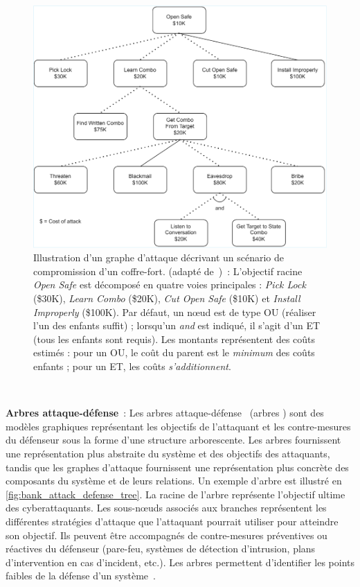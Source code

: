 \begin{figure}[h!]
  \centering
  \includegraphics[width=0.8\linewidth]{figures/attack_graph.pdf}
  \caption[Illustration d'un graphe d'attaque décrivant un scénario de compromission d'un coffre-fort.]{Illustration d'un graphe d'attaque décrivant un scénario de compromission d'un coffre-fort. (adapté de~\cite{schneier1999modeling})~: L'objectif racine \emph{Open Safe} est décomposé en quatre voies principales : \emph{Pick Lock} (\$30K), \emph{Learn Combo} (\$20K), \emph{Cut Open Safe} (\$10K) et \emph{Install Improperly} (\$100K). Par défaut, un nœud est de type \textsc{OU} (réaliser l'un des enfants suffit) ;
    lorsqu'un \emph{and} est indiqué, il s'agit d'un \textsc{ET} (tous les enfants sont requis). Les montants représentent des coûts estimés : pour un \textsc{OU}, le coût du parent est le \emph{minimum} des coûts enfants ;
    pour un \textsc{ET}, les coûts \emph{s'additionnent}.}
  \label{fig:attack_graphs}
\end{figure}

\

\noindent
\textbf{Arbres attaque-défense}~: \quad Les arbres attaque-défense~\cite{BKordy2010} (arbres ) sont des modèles graphiques représentant les objectifs de l'attaquant et les contre-mesures du défenseur sous la forme d'une structure arborescente. Les arbres  fournissent une représentation plus abstraite du système et des objectifs des attaquants, tandis que les graphes d'attaque fournissent une représentation plus concrète des composants du système et de leurs relations. Un exemple d'arbre  est illustré en \autoref{fig:bank_attack_defense_tree}. La racine de l'arbre  représente l'objectif ultime des cyberattaquants. Les sous-nœuds associés aux branches représentent les différentes stratégies d'attaque que l'attaquant pourrait utiliser pour atteindre son objectif. Ils peuvent être accompagnés de contre-mesures préventives ou réactives du défenseur (pare-feu, systèmes de détection d'intrusion, plans d'intervention en cas d'incident, etc.).
Les arbres  permettent d'identifier les points faibles de la défense d'un système~\cite{BKordy2010}.

